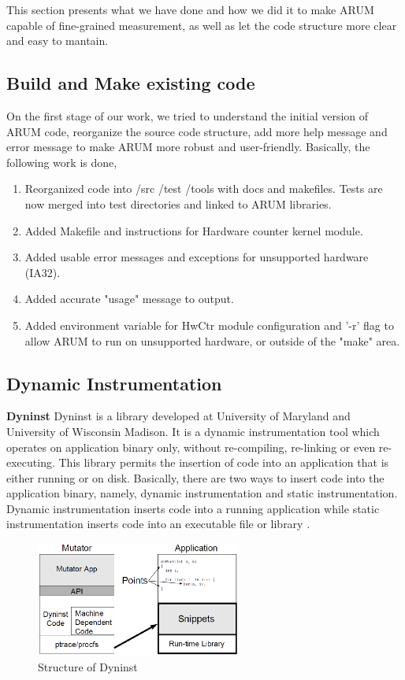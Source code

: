\documentclass[11pt,letterpaper,oneside]{article}
\begin{document}
This section presents what we have done and how we did it to make ARUM capable of fine-grained measurement, as well as let the code structure more clear and easy to mantain.

\subsection{Build and Make existing code}
On the first stage of our work, we tried to understand the initial version of ARUM code, reorganize the source code structure, add more help message and error message to make ARUM more robust and user-friendly. Basically, the following work is done,
\begin{enumerate}
\item Reorganized code into /src /test /tools with docs and makefiles.  Tests are now merged into test directories and linked to ARUM libraries.
\item Added Makefile and instructions for Hardware counter kernel module.
\item Added usable error messages and exceptions for unsupported hardware (IA32).
\item Added accurate "usage" message to output.
\item Added environment variable for HwCtr module configuration and '-r' flag to allow ARUM to run on unsupported hardware, or outside of the "make" area.
\end{enumerate}

\subsection{Dynamic Instrumentation}
\textbf{Dyninst}\newline
\indent Dyninst is a library developed at University of Maryland and University of Wisconsin Madison. It is a dynamic instrumentation tool which operates on application binary only, without re-compiling, re-linking or even re-executing. This library permits the insertion of code into an application that is either running or on disk. Basically, there are two ways to insert code into the application binary, namely, dynamic instrumentation and static instrumentation. Dynamic instrumentation inserts code into a running application while static instrumentation inserts code into an executable file or library \cite{bib:dyninstmanual}.

\begin{figure}
\begin{center}
\includegraphics[width=0.6\textwidth]{dyninst.eps}
\caption{Structure of Dyninst}
\label{fig:dyninst}
\end{center}
\end{figure}
\end{document}
